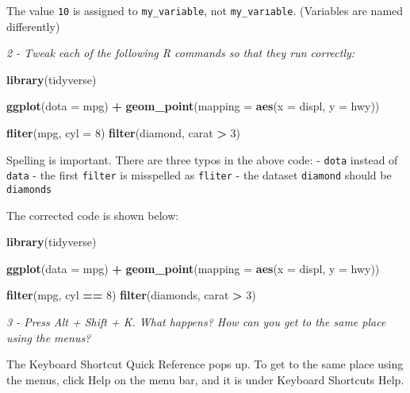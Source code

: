 \documentclass[]{article}
\newenvironment{Shaded}{\begin{snugshade}}{\end{snugshade}}
\newcommand{\KeywordTok}[1]{\textcolor[rgb]{0.13,0.29,0.53}{\textbf{#1}}}
\newcommand{\DataTypeTok}[1]{\textcolor[rgb]{0.13,0.29,0.53}{#1}}
\newcommand{\DecValTok}[1]{\textcolor[rgb]{0.00,0.00,0.81}{#1}}
\newcommand{\StringTok}[1]{\textcolor[rgb]{0.31,0.60,0.02}{#1}}
\newcommand{\OperatorTok}[1]{\textcolor[rgb]{0.81,0.36,0.00}{\textbf{#1}}}
\newcommand{\NormalTok}[1]{#1}
\theoremstyle{definition}
\theoremstyle{definition}
\theoremstyle{definition}
\theoremstyle{remark}
\begin{document}
The value \texttt{10} is assigned to \texttt{my\_variable}, not
\texttt{my\_varıable}. (Variables are named differently)

\emph{2 - Tweak each of the following R commands so that they run
correctly:}

\begin{Shaded}
\begin{Highlighting}[]
\KeywordTok{library}\NormalTok{(tidyverse)}

\KeywordTok{ggplot}\NormalTok{(}\DataTypeTok{dota =}\NormalTok{ mpg) }\OperatorTok{+}\StringTok{ }
\StringTok{  }\KeywordTok{geom_point}\NormalTok{(}\DataTypeTok{mapping =} \KeywordTok{aes}\NormalTok{(}\DataTypeTok{x =}\NormalTok{ displ, }\DataTypeTok{y =}\NormalTok{ hwy))}

\KeywordTok{fliter}\NormalTok{(mpg, }\DataTypeTok{cyl =} \DecValTok{8}\NormalTok{)}
\KeywordTok{filter}\NormalTok{(diamond, carat }\OperatorTok{>}\StringTok{ }\DecValTok{3}\NormalTok{)}
\end{Highlighting}
\end{Shaded}

Spelling is important. There are three typos in the above code: -
\texttt{dota} instead of \texttt{data} - the first \texttt{filter} is
misspelled as \texttt{fliter} - the dataset \texttt{diamond} should be
\texttt{diamonds}

The corrected code is shown below:

\begin{Shaded}
\begin{Highlighting}[]
\KeywordTok{library}\NormalTok{(tidyverse)}

\KeywordTok{ggplot}\NormalTok{(}\DataTypeTok{data =}\NormalTok{ mpg) }\OperatorTok{+}\StringTok{ }
\StringTok{  }\KeywordTok{geom_point}\NormalTok{(}\DataTypeTok{mapping =} \KeywordTok{aes}\NormalTok{(}\DataTypeTok{x =}\NormalTok{ displ, }\DataTypeTok{y =}\NormalTok{ hwy))}

\KeywordTok{filter}\NormalTok{(mpg, cyl }\OperatorTok{==}\StringTok{ }\DecValTok{8}\NormalTok{)}
\KeywordTok{filter}\NormalTok{(diamonds, carat }\OperatorTok{>}\StringTok{ }\DecValTok{3}\NormalTok{)}
\end{Highlighting}
\end{Shaded}

\emph{3 - Press Alt + Shift + K. What happens? How can you get to the
same place using the menus?}

The Keyboard Shortcut Quick Reference pops up. To get to the same place
using the menus, click Help on the menu bar, and it is under Keyboard
Shortcuts Help.
\end{document}
